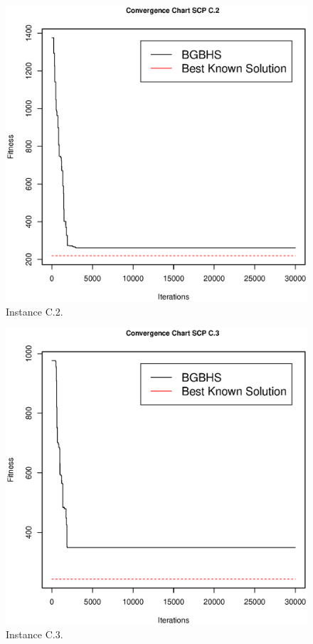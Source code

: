 \begin{figure}[]
\centering
\includegraphics[scale=.45]{Resultados/scpC2.eps}
\caption{Instance C.2.}
\label{fig:Instance.C.2}
\end{figure}

\begin{figure}[]
\centering
\includegraphics[scale=.45]{Resultados/scpC3.eps}
\caption{Instance C.3.}
\label{fig:Instance.C.3}
\end{figure}

